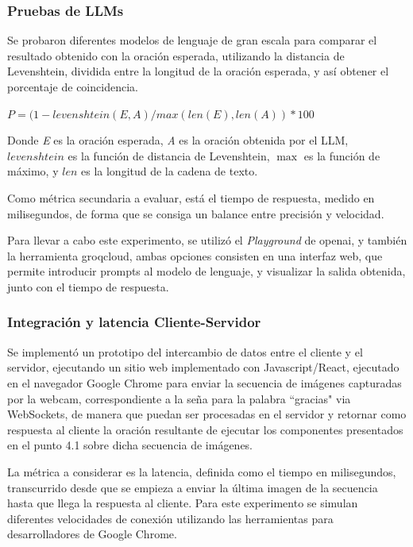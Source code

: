 \documentclass[10pt]{article}
\begin{document}
\subsubsection{Pruebas de LLMs}

Se probaron diferentes modelos de lenguaje de gran escala para comparar el resultado obtenido con la oración esperada, utilizando la distancia de Levenshtein, dividida entre la longitud de la oración esperada, y así obtener el porcentaje de coincidencia.

\vspace{2\baselineskip}
\( P  =  (1 -levenshtein(E, A) / max(len(E), len(A)) \ast  100\)

\vspace{2\baselineskip}
Donde \textit{E} es la oración esperada, \textit{A }es la oración obtenida por el LLM, \( levenshtein\) es la función de distancia de Levenshtein, \( \max\) es la función de máximo, y \( len\) es la longitud de la cadena de texto.

\vspace{1\baselineskip}
Como métrica secundaria a evaluar, está el tiempo de respuesta, medido en milisegundos, de forma que se consiga un balance entre precisión y velocidad.

\vspace{1\baselineskip}
Para llevar a cabo este experimento, se utilizó el \textit{Playground }de openai, y también la herramienta groqcloud, ambas opciones consisten en una interfaz web, que permite introducir prompts al modelo de lenguaje, y visualizar la salida obtenida, junto con el tiempo de respuesta.

\vspace{1\baselineskip}
\subsubsection{Integración y latencia Cliente-Servidor}

Se implementó un prototipo del intercambio de datos entre el cliente y el servidor, ejecutando un sitio web implementado con Javascript/React, ejecutado en el navegador Google Chrome para enviar la secuencia de imágenes capturadas por la webcam, correspondiente a la seña para la palabra ``gracias" via WebSockets, de manera que puedan ser procesadas en el servidor y retornar como respuesta al cliente la oración resultante de ejecutar los componentes presentados en el punto 4.1 sobre dicha secuencia de imágenes.

\vspace{1\baselineskip}
La métrica a considerar es la latencia, definida como el tiempo en milisegundos, transcurrido desde que se empieza a enviar la última imagen de la secuencia hasta que llega la respuesta al cliente. Para este experimento se simulan diferentes velocidades de conexión utilizando las herramientas para desarrolladores de Google Chrome.
\end{document}
